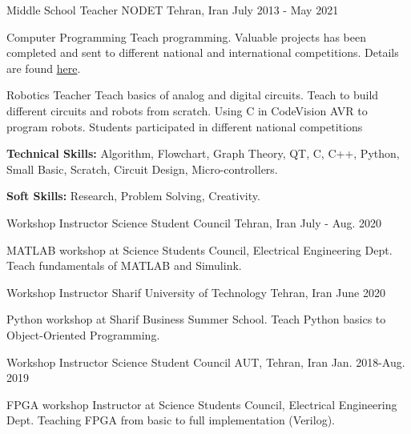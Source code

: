 \begin{cventries}
  \cventry
    {Middle School Teacher}
    {NODET}
    {Tehran, Iran}
    {July 2013 -  May 2021}
    {
      \begin{cvitems} %
        \item{Computer Programming}
          {Teach programming. Valuable projects has been completed and sent to different national and international competitions. Details are found \href{https://sites.google.com/view/steacher/farzanegan-1-high-school/junior-programming}{here}.}
        \item{Robotics Teacher}
          {Teach basics of analog and digital circuits. Teach to build different circuits and robots from scratch. Using C in CodeVision AVR to program robots. Students participated in different national competitions}
        \item {\textbf{Technical Skills:} Algorithm, Flowchart, Graph Theory, QT, C, C++, Python, Small Basic, Scratch, Circuit Design, Micro-controllers.}
        \item {\textbf{Soft Skills:} Research, Problem Solving, Creativity.}
      \end{cvitems}
    }

\cventry
{Workshop Instructor}
{Science Student Council}
{Tehran, Iran}
{July - Aug. 2020}
{
  \begin{cvitems} %
    \item{MATLAB workshop at Science Students Council, Electrical Engineering Dept. Teach fundamentals of MATLAB and Simulink.}
  \end{cvitems}
}

\cventry
{Workshop Instructor}
{Sharif University of Technology}
{Tehran, Iran}
{June 2020}
{
  \begin{cvitems} %
    \item{Python workshop at Sharif Business Summer School. Teach Python basics to Object-Oriented Programming.}
  \end{cvitems}
}

\cventry
{Workshop Instructor}
{Science Student Council}
{AUT, Tehran, Iran}
{Jan. 2018-Aug. 2019}
{
  \begin{cvitems} %
    \item{FPGA workshop Instructor at Science Students Council, Electrical Engineering Dept. Teaching FPGA from basic to full implementation (Verilog).}
  \end{cvitems}
}


\end{cventries}
